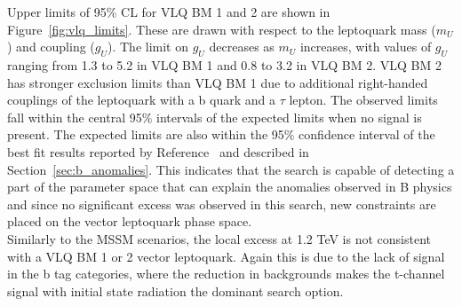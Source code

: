 Upper limits of 95\% \ac{CL} for VLQ BM 1 and 2 are shown in Figure~\ref{fig:vlq_limits}. 
These are drawn with respect to the leptoquark mass ($m_{U}$) and coupling ($g_{U}$).
The limit on $g_{U}$ decreases as $m_{U}$ increases, with values of $g_U$ ranging from 1.3 to 5.2 in VLQ BM 1 and 0.8 to 3.2 in VLQ BM 2. 
VLQ BM 2 has stronger exclusion limits than VLQ BM 1 due to additional right-handed couplings of the leptoquark with a b quark and a $\tau$ lepton.
The observed limits fall within the central 95\% intervals of the expected limits when no signal is present. 
The expected limits are also within the 95\% confidence interval of the best fit results reported by Reference~\cite{Cornella:2021sby} and described in Section~\ref{sec:b_anomalies}.
This indicates that the search is capable of detecting a part of the parameter space that can explain the anomalies observed in B physics and since no significant excess was observed in this search, new constraints are placed on the vector leptoquark phase space. \\

Similarly to the \ac{MSSM} scenarios, the local excess at 1.2 TeV is not consistent with a VLQ BM 1 or 2 vector leptoquark.
Again this is due to the lack of signal in the b tag categories, where the reduction in backgrounds makes the t-channel signal with initial state radiation the dominant search option.

